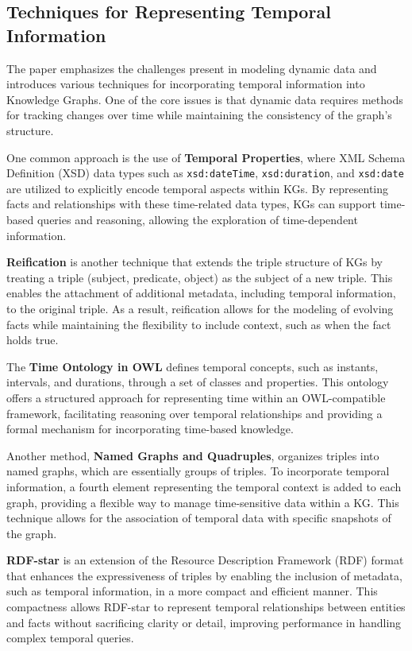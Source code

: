 \subsection{Techniques for Representing Temporal Information}

The paper emphasizes the challenges present in modeling dynamic data and introduces various techniques for incorporating temporal information into Knowledge Graphs. One of the core issues is that dynamic data requires methods for tracking changes over time while maintaining the consistency of the graph's structure.

One common approach is the use of \textbf{Temporal Properties}, where XML Schema Definition (XSD) data types such as \texttt{xsd:dateTime}, \texttt{xsd:duration}, and \texttt{xsd:date} are utilized to explicitly encode temporal aspects within KGs. By representing facts and relationships with these time-related data types, KGs can support time-based queries and reasoning, allowing the exploration of time-dependent information.

\textbf{Reification} is another technique that extends the triple structure of KGs by treating a triple (subject, predicate, object) as the subject of a new triple. This enables the attachment of additional metadata, including temporal information, to the original triple. As a result, reification allows for the modeling of evolving facts while maintaining the flexibility to include context, such as when the fact holds true.

The \textbf{Time Ontology in OWL} defines temporal concepts, such as instants, intervals, and durations, through a set of classes and properties. This ontology offers a structured approach for representing time within an OWL-compatible framework, facilitating reasoning over temporal relationships and providing a formal mechanism for incorporating time-based knowledge.

Another method, \textbf{Named Graphs and Quadruples}, organizes triples into named graphs, which are essentially groups of triples. To incorporate temporal information, a fourth element representing the temporal context is added to each graph, providing a flexible way to manage time-sensitive data within a KG. This technique allows for the association of temporal data with specific snapshots of the graph.

\textbf{RDF-star} is an extension of the Resource Description Framework (RDF) format that enhances the expressiveness of triples by enabling the inclusion of metadata, such as temporal information, in a more compact and efficient manner. This compactness allows RDF-star to represent temporal relationships between entities and facts without sacrificing clarity or detail, improving performance in handling complex temporal queries.

